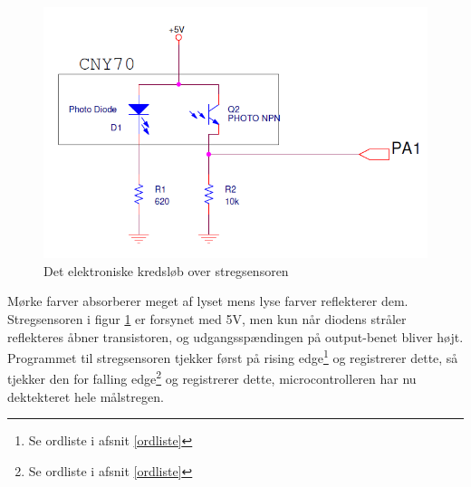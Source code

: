 \begin{figure}[h!]
\centering
\includegraphics[scale=0.6]{./Graphics/Stregsensor_kredslob}
\caption{Det elektroniske kredsløb over stregsensoren}
\label{Stregsensor}
\end{figure}

Mørke farver absorberer meget af lyset mens lyse farver reflekterer dem. \\
Stregsensoren i figur \ref{Stregsensor} er forsynet med 5V, men kun når diodens stråler reflekteres åbner transistoren, og udgangsspændingen på output-benet bliver højt.\\
Programmet til stregsensoren tjekker først på rising edge\footnote{Se ordliste i afsnit \ref{ordliste}} og registrerer dette, så tjekker den for falling edge\footnote{Se ordliste i afsnit \ref{ordliste}} og registrerer dette, microcontrolleren har nu dektekteret hele målstregen. \\

